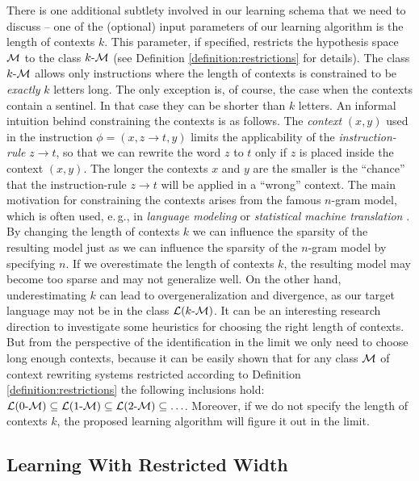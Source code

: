 There is one additional subtlety involved in our learning schema that we need to discuss -- one of the (optional) input parameters of our learning algorithm is the length of contexts $k$. This parameter, if specified, restricts the hypothesis space $\calM$ to the class $\kcalM$ (see Definition \ref{definition:restrictions} for details). The class  $\kcalM$ allows only instructions where the length of contexts is constrained to be \emph{exactly} $k$ letters long. The only exception is, of course, the case when the contexts contain a sentinel. In that case they can be shorter than $k$ letters. An informal intuition behind constraining the contexts is as follows. The \emph{context} $(x, y)$ used in the instruction $\phi = (x, z \to t, y)$ limits the applicability of the \emph{instruction-rule} $z \to t$, so that we can rewrite the word $z$ to $t$ only if $z$ is placed inside the context $(x, y)$. The longer the contexts $x$ and $y$ are the smaller is the ``chance'' that the instruction-rule $z \to t$ will be applied in a ``wrong'' context. The main motivation for constraining the contexts arises from the famous $n$-gram model, which is often used, e.\,g., in \emph{language modeling} or \emph{statistical machine translation} \cite{Jurafsky}. By changing the length of contexts $k$ we can influence the sparsity of the resulting model just as we can influence the sparsity of the $n$-gram model by specifying $n$. If we overestimate the length of contexts $k$, the resulting model may become too sparse and may not generalize well. On the other hand, underestimating $k$ can lead to overgeneralization and divergence, as our target language may not be in the class $\calL{\kcalM}$. It can be an interesting research direction to investigate some heuristics for choosing the right length of contexts. But from the perspective of the identification in the limit we only need to choose long enough contexts, because it can be easily shown that for any class $\calM$ of context rewriting systems restricted according to Definition \ref{definition:restrictions} the following inclusions hold: $\calL{\kcalM[0]} \subseteq \calL{\kcalM[1]} \subseteq \calL{\kcalM[2]} \subseteq \ldots$. Moreover, if we do not specify the length of contexts $k$, the proposed learning algorithm will figure it out in the limit.

\subsection{Learning With Restricted Width}\label{section:restricted-learning}

